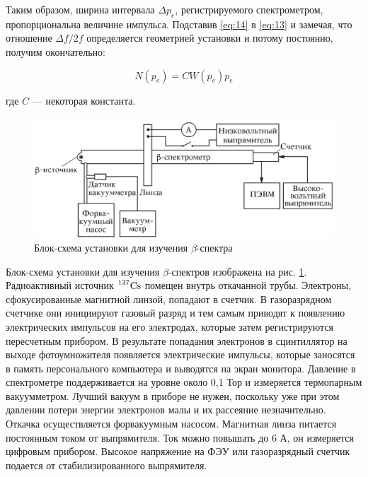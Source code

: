 \documentclass[a4paper,12pt]{article}
\begin{document}
Таким образом, ширина интервала $\Delta p_e$, регистрируемого спектрометром, пропорциональна величине импульса. Подставив \eqref{eq:14} в \eqref{eq:13} и замечая, что отношение $\Delta f /2f$ определяется геометрией установки и потому постоянно, получим окончательно:

\begin{equation}\label{eq:15}
    N (p_e) = CW (p_e) p_e
\end{equation}

где $C$ — некоторая константа.

\FloatBarrier
\begin{figure}[h]
    \begin{center}
        \includegraphics[width = 1\textwidth]{pics/ustan_2.png}
        \caption{Блок-схема установки для изучения $\beta$-спектра}
    \label{pic:ustan-2}
    \end{center}
\end{figure}
\FloatBarrier


Блок-схема установки для изучения $\beta$-спектров изображена на рис. \ref{pic:ustan-2}. Радиоактивный источник $\prescript{137}{}{\text{Cs}}$ помещен внутрь откачанной трубы. Электроны, сфокусированные магнитной линзой, попадают в счетчик. В газоразрядном счетчике они инициируют газовый разряд и тем самым приводят к появлению электрических импульсов на его электродах, которые затем регистрируются пересчетным прибором. В результате попадания электронов в сцинтиллятор на выходе фотоумножителя появляется электрические импульсы, которые заносятся в память персонального компьютера и выводятся на экран монитора. Давление в спектрометре поддерживается на уровне около 0,1 Тор и измеряется термопарным вакуумметром. Лучший вакуум в приборе не нужен, поскольку уже при этом давлении потери энергии электронов малы и их рассеяние незначительно. Откачка осуществляется форвакуумным насосом. Магнитная линза питается постоянным током от выпрямителя. Ток можно повышать до 6 А, он измеряется цифровым прибором. Высокое напряжение на ФЭУ или газоразрядный счетчик подается от стабилизированного выпрямителя.
\end{document}
